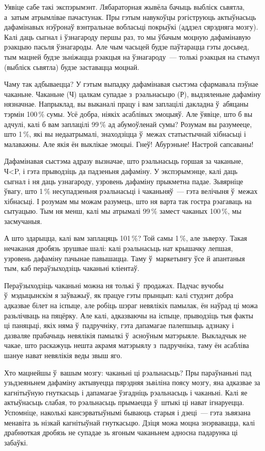 Уявіце сабе такі экспэрымэнт. Лябараторная жывёла бачыць выбліск сьвятла, а~затым атрымлівае пачастунак. Пры гэтым навукоўцы рэгіструюць актыўнасьць дафамінавых нэўронаў вэнтральнае вобласьці покрыўкі (аддзел сярэдняга мозгу). Калі даць сыгнал і ўзнагароду першы раз, то мы ўбачым моцную дафамінавую рэакцыю пасьля ўзнагароды. Але чым часьцей будзе паўтарацца гэты досьвед, тым мацней будзе зьніжацца рэакцыя на ўзнагароду~--- толькі рэакцыя на стымул (выбліск сьвятла) будзе заставацца моцнай.

Чаму так адбываецца? У гэтым выпадку дафамінавая сыстэма сфармавала пэўнае чаканьне. Чаканьне (Ч) цалкам супадае з~рэальнасьцю (Р), выдзяленьне дафаміну нязначнае. Напрыклад, вы выканалі працу і вам заплацілі дакладна ў~абяцаны тэрмін 100\,\% сумы. Усё добра, ніякіх асаблівых эмоцыяў. Але ўявіце, што б вы адчулі, калі б вам заплацілі 99\,\% ад абумоўленай сумы? Розумам вы разумееце, што 1\,\%, які вы недаатрымалі, знаходзіцца ў~межах статыстычнай хібнасьці і малаважны. Але якія ён выклікае эмоцыі. Гнеў! Абурэньне! Настрой сапсаваны!

Дафамінавая сыстэма адразу вызначае, што рэальнасьць горшая за чаканьне, Ч<P, і гэта прыводзіць да падзеньня дафаміну. У экспэрымэнце, калі даць сыгнал і ня даць узнагароду, узровень дафаміну прыкметна падае. Зьвярніце ўвагу, што 1\,\% несупадзеньня рэальнасьці і чаканьняў~--- гэта велічыня ў~межах хібнасьці. І розумам мы можам разумець, што ня варта так гостра рэагаваць на сытуацыю. Тым ня менш, калі мы атрымалі 99\,\% замест чаканых 100\,\%, мы засмучаныя.

А што здарыцца, калі вам заплацяць 101\,\%? Той самы 1\,\%, але зьверху. Такая нечаканая дробязь зрушвае шалі: калі рэальнасьць нат крышачку лепшая, узровень дафаміну пачынае павышацца. Таму ў~маркетынгу ўсе й апантаныя тым, каб пераўзыходзіць чаканьні кліентаў.

Пераўзыходзіць чаканьні можна ня толькі ў~продажах. Падчас вучобы ў~мэдыцынскім я заўважыў, як працуе гэты прынцып: калі студэнт добра адказвае білет на іспыце, але робіць шэраг невялікіх памылак, ён наўрад ці можа разьлічваць на пяцёрку. Але калі, адказваючы на іспыце, прыводзіць тыя факты ці паняцьці, якіх няма ў~падручніку, гэта дапамагае палепшыць адзнаку і дазваляе прабачыць невялікія памылкі ў~асноўным матэрыяле. Выкладчык не чакае, што раскажуць нешта акрамя матэрыялу з~падручніка, таму ён асабліва шануе нават невялікія веды звыш яго.

Хто мацнейшы ў~вашым мозгу: чаканьні ці рэальнасьць? Пры параўнаньні пад узьдзеяньнем дафаміну актывуецца пярэдняя зьвіліна поясу мозгу, яна адказвае за кагнітыўную гнуткасьць і дапамагае ўзгадніць рэальнасьць і чаканьні. Калі яе актыўнасьць слабая, то рэальнасьць прымаецца ў~штыкі ці нават ігнаруецца. Успомніце, наколькі кансэрватыўнымі бываюць старыя і дзеці~--- гэта зьвязана менавіта зь нізкай кагнітыўнай гнуткасьцю. Дзіця можа моцна знэрвавацца, калі драбнюткая дробязь не супадае зь ягоным чаканьнем адносна падарунка ці забаўкі.

